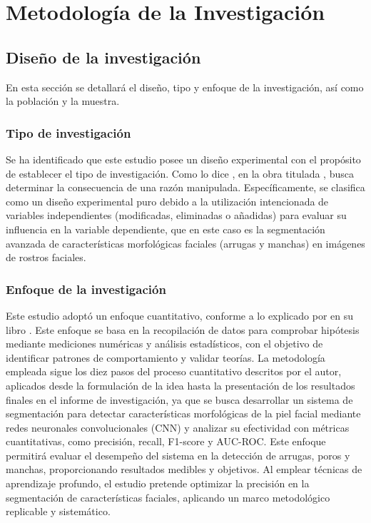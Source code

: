 \chapter{Metodología de la Investigación}
\section{Diseño de la investigación}
En esta sección se detallará el diseño, tipo y enfoque de la investigación, así como la población y la muestra.

\subsection{Tipo de investigación}
Se ha identificado que este estudio posee un diseño experimental con el propósito de establecer el tipo de investigación. Como lo dice \cite{bk_hernandez2014metodologia}, en la obra titulada , busca determinar la consecuencia de una razón manipulada. Específicamente, se clasifica como un diseño experimental puro debido a la utilización intencionada de variables independientes (modificadas, eliminadas o añadidas) para evaluar su influencia en la variable dependiente, que en este caso es la segmentación avanzada de características morfológicas faciales (arrugas y manchas) en imágenes de rostros faciales.

\subsection{Enfoque de la investigación}
Este estudio adoptó un enfoque cuantitativo, conforme a lo explicado por \cite{bk_hernandez2014metodologia} en su libro . Este enfoque se basa en la recopilación de datos para comprobar hipótesis mediante mediciones numéricas y análisis estadísticos, con el objetivo de identificar patrones de comportamiento y validar teorías. La metodología empleada sigue los diez pasos del proceso cuantitativo descritos por el autor, aplicados desde la formulación de la idea hasta la presentación de los resultados finales en el informe de investigación, ya que se busca desarrollar un sistema de segmentación para detectar características morfológicas de la piel facial mediante redes neuronales convolucionales (CNN) y analizar su efectividad con métricas cuantitativas, como precisión, recall, F1-score y AUC-ROC. Este enfoque permitirá evaluar el desempeño del sistema en la detección de arrugas, poros y manchas, proporcionando resultados medibles y objetivos. \parencite{esteva2017} Al emplear técnicas de aprendizaje profundo, el estudio pretende optimizar la precisión en la segmentación de características faciales, aplicando un marco metodológico replicable y sistemático. \parencite{phillips2020}

